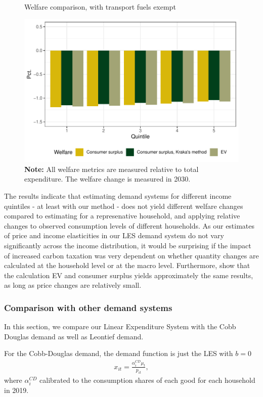 \begin{figure}[H]
\centering
\caption{Welfare comparison, with transport fuels exempt}
\label{krakasamlign2}
\includegraphics[width=.7\textwidth]{Figures/IO-resultater/bar_sammenlign_benzundtag.pdf}
\captionsetup{singlelinecheck=off,size=scriptsize}
\setlength{\captionmargin}{10pt}
\caption*{
\textbf{Note:} All welfare metrics are measured relative to total expenditure. The welfare change is measured in 2030.\\}
\end{figure}
The results indicate that estimating demand systems for different income quintiles - at least with our method - does not yield different welfare changes compared to estimating for a represenative household, and applying relative changes to observed consumption levels of different households. As our estimates of price and income elasticities in our LES demand system do not vary significantly across the income distribution, it would be surprising if the impact of increased carbon taxation was very dependent on whether quantity changes are calculated at the household level or at the macro level. Furthermore, \cite{araar2019prices} show that the calculation EV and consumer surplus yields approximately the same results, as long as price changes are relatively small.


\subsubsection{Comparison with other demand systems}
In this section, we compare our Linear Expenditure System with the Cobb Douglas demand as well as Leontief demand. 

For the Cobb-Douglas demand, the demand function is just the LES with $b=0$
\begin{align}
   x_{it} = \frac{\alpha^{CD}_i \mu_t}{p_{it}},
\end{align}
where $\alpha^{CD}_i$ calibrated to the consumption shares of each good for each household in 2019.

